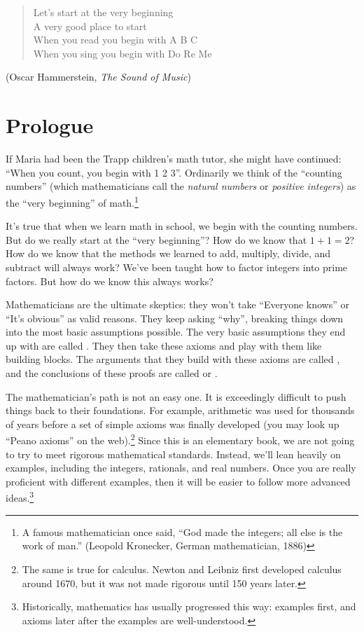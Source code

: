 
\begin{verse}
Let's start at the very beginning\\
A very good place to start\\
When you read you begin with A B C\\
When you sing you begin with Do Re Me
\end{verse}
\medskip

(Oscar Hammerstein, \emph{The Sound of Music})


\section{Prologue}
If Maria had been the Trapp children's math tutor, she might have continued:  ``When you count, you begin with 1 2 3''. Ordinarily we think of the ``counting numbers''  (which mathematicians call the \emph{natural numbers} or \emph{positive integers}) as the ``very beginning'' of math.\footnote{A famous mathematician once said, ``God made the integers; all else is the work of man.'' (Leopold Kronecker, German mathematician, 1886)}
\medskip

It's true that when we learn math in school, we begin with the counting numbers. But do we really start at the ``very beginning''?   How do we know that $1 + 1 = 2$? How do we know that the methods we learned to add,  multiply, divide, and subtract will always work? We've been taught how to factor integers into prime factors. But how do we know this always works?

 Mathematicians  are the ultimate skeptics: they won't take ``Everyone knows'' or ``It's obvious''  as valid reasons. They keep asking ``why'', breaking things down into the most basic assumptions possible. The very basic assumptions they end up with are called . They then take these axioms and play with them like building blocks. The arguments that they build with these axioms are called , and the conclusions of these proofs are called  or .  

The mathematician's path is not an easy one. It is exceedingly  difficult to push things back to their foundations. For example, arithmetic was used for thousands of years before a set of simple axioms was finally developed (you may look up ``Peano axioms'' on the web).\footnote{The same is true for calculus. Newton and Leibniz first developed calculus around 1670, but it was not made rigorous until 150 years later.}
Since this is an elementary book, we are not going to try to meet rigorous mathematical standards. Instead, we'll lean heavily on examples, including the integers, rationals, and real numbers. Once you are really proficient with different examples, then it will be easier to follow more advanced ideas.\footnote{Historically, mathematics has usually progressed this way: examples first, 
and axioms later after the examples are well-understood.}


